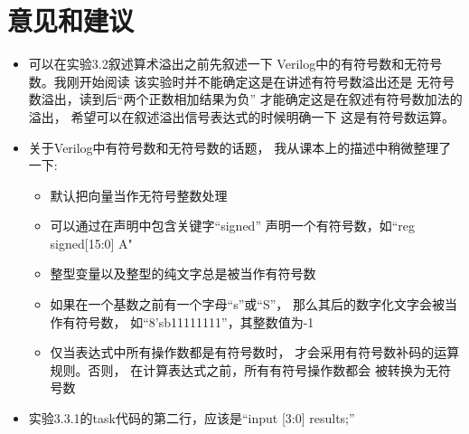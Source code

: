 \documentclass[12pt,a4paper,UTF8]{article}
\begin{document}
\section{意见和建议}
\begin{itemize}
  \item 可以在实验3.2叙述算术溢出之前先叙述一下
        Verilog中的有符号数和无符号数。我刚开始阅读
        该实验时并不能确定这是在讲述有符号数溢出还是
        无符号数溢出，读到后``两个正数相加结果为负''
        才能确定这是在叙述有符号数加法的溢出，
        希望可以在叙述溢出信号表达式的时候明确一下
        这是有符号数运算。
  \item 关于Verilog中有符号数和无符号数的话题，
        我从课本上的描述中稍微整理了一下:
        \begin{itemize}
          \item 默认把向量当作无符号整数处理
          \item 可以通过在声明中包含关键字``signed''
                声明一个有符号数，如``reg signed[15:0] A"
          \item 整型变量以及整型的纯文字总是被当作有符号数
          \item 如果在一个基数之前有一个字母``s''或``S''，
                那么其后的数字化文字会被当作有符号数，
                如``8'sb11111111''，其整数值为-1
          \item 仅当表达式中所有操作数都是有符号数时，
                才会采用有符号数补码的运算规则。否则，
                在计算表达式之前，所有有符号操作数都会
                被转换为无符号数
        \end{itemize}
  \item 实验3.3.1的task代码的第二行，应该是``input [3:0] results;''
\end{itemize}
\end{document}
